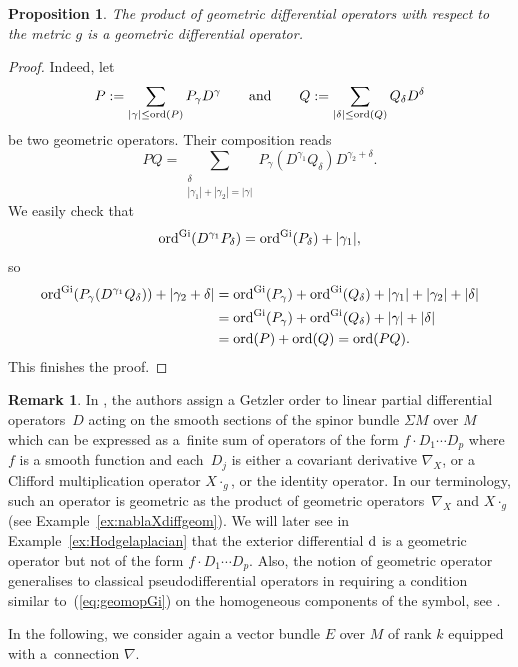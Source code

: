\documentclass[pdftex]{sigma}
\numberwithin{equation}{section}
\newtheorem{prop}[thm]{Proposition}
\theoremstyle{definition}
\newtheorem{rk}[thm]{Remark}
\begin{document}
\begin{prop}\label{prop:productgeom}
The product of geometric differential operators with respect to
the metric $g$ is a geometric differential operator.
\end{prop}
\begin{proof}
Indeed, let
\[P:= \sum_{\vert\gamma\vert \leq {\rm ord} (P)} {P_{\gamma}D^{\gamma}}\qquad\text{and}\qquad Q:= \sum_{\vert\delta\vert \leq {\rm ord} (Q)} {Q_{\delta}D^{\delta}}\]
be two geometric operators. Their composition reads			
\[PQ= \sum_{\substack{\delta\\ |\gamma_1|+|\gamma_2|=|\gamma| } } P_{\gamma} (D^{\gamma_1} Q_{\delta}) D^{\gamma_2+\delta}.\]
We easily check that
\[{\rm ord}^{\rm Gi} (D^{\gamma_1} P_{\delta} )= {\rm ord}^{\rm Gi} (P_{\delta} )+\vert {\gamma_1}\vert,\]
so
\begin{align*}
{\rm ord}^{\rm Gi} (P_\gamma (D^{\gamma_1} Q_{\delta}) )+|\gamma_2+\delta|&{}= {\rm ord}^{\rm Gi}(P_\gamma)+{\rm ord}^{\rm Gi} (Q_{\delta} )+\vert {\gamma_1}\vert+\vert {\gamma_2}\vert+\vert {\delta}\vert\\
&{}= {\rm ord}^{\rm Gi}(P_\gamma)+{\rm ord}^{\rm Gi} (Q_{\delta} )+\vert {\gamma}\vert+\vert {\delta}\vert\\
&{}= {\rm ord} (P)+{\rm ord} (Q) = {\rm ord} (PQ).
\end{align*}
This finishes the proof.
\end{proof}
\begin{rk} In \cite{HY}, the authors assign a Getzler order to linear partial differential operators~$D$ acting on the smooth sections of the spinor bundle $\Sigma M$ over $M$ which can be expressed as a~finite sum of operators of the form $f\cdot D_1\cdots D_p$ where $f$ is a smooth function and each~$D_j$ is either a covariant derivative $\nabla_X$, or a Clifford multiplication operator $X\cdot_g$, or the identity operator. In our terminology, such an operator is geometric as the product of geometric operators~$\nabla_X$ and $X\cdot_g$ (see Example~\ref{ex:nablaXdiffgeom}). We will later see in Example~\ref{ex:Hodgelaplacian} that the exterior differential ${\rm d}$ is a geometric operator but not of the form $f\cdot D_1\cdots D_p$. Also, the notion of geometric operator generalises to classical pseudodifferential operators in requiring a condition similar to~(\ref{eq:geomopGi}) on the homogeneous components of the symbol, see \cite{MP}.
\end{rk}

In the following, we consider again a vector bundle $E$ over $M$ of rank $k$ equipped with a~connection $\nabla$.
\end{document}
